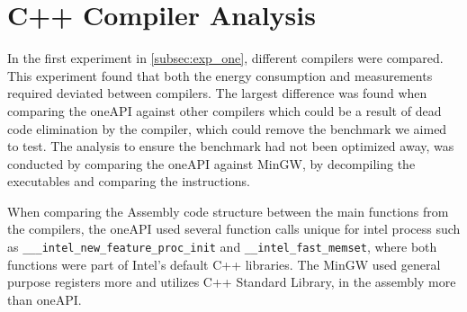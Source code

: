 \section{C++ Compiler Analysis}\label{app:compiler-analysis}

In the first experiment in \cref{subsec:exp_one}, different compilers were compared. This experiment found that both the energy consumption and measurements required deviated between compilers. The largest difference was found when comparing the oneAPI against other compilers which could be a result of dead code elimination by the compiler, which could remove the benchmark we aimed to test\cite{sestoft2013microbenchmarks}. The analysis to ensure the benchmark had not been optimized away, was conducted by comparing the oneAPI against MinGW, by decompiling the executables and comparing the instructions.


When comparing the Assembly code structure between the main functions from the compilers, the oneAPI used several function calls unique for intel process such as \texttt{\_\_\_intel\_new\_feature\_proc\_init} and \texttt{\_\_intel\_fast\_memset}, where both functions were part of Intel's default C++ libraries\cite{Intelassembly}. The MinGW used general purpose registers more and utilizes C++ Standard Library, in the assembly more than oneAPI.






